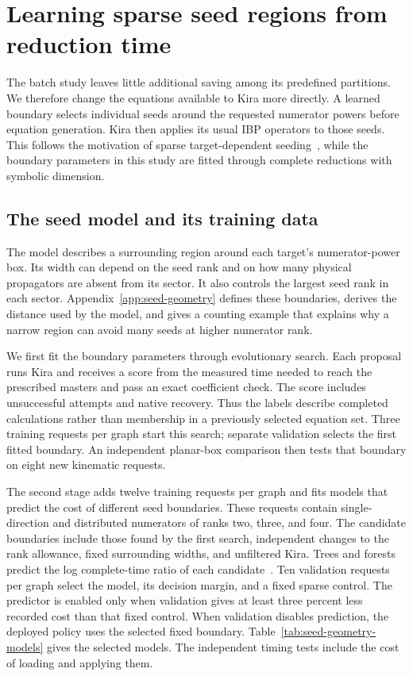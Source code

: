\section{Learning sparse seed regions from reduction time}
\label{sec:seed-geometry}
The batch study leaves little additional saving among its predefined partitions. We therefore change the equations available to Kira more directly. A learned boundary selects individual seeds around the requested numerator powers before equation generation. Kira then applies its usual IBP operators to those seeds. This follows the motivation of sparse target-dependent seeding~\cite{TubeSeeding2026}, while the boundary parameters in this study are fitted through complete reductions with symbolic dimension.

\subsection{The seed model and its training data}
The model describes a surrounding region around each target's numerator-power box. Its width can depend on the seed rank and on how many physical propagators are absent from its sector. It also controls the largest seed rank in each sector. Appendix~\ref{app:seed-geometry} defines these boundaries, derives the distance used by the model, and gives a counting example that explains why a narrow region can avoid many seeds at higher numerator rank.

We first fit the boundary parameters through evolutionary search. Each proposal runs Kira and receives a score from the measured time needed to reach the prescribed masters and pass an exact coefficient check. The score includes unsuccessful attempts and native recovery. Thus the labels describe completed calculations rather than membership in a previously selected equation set. Three training requests per graph start this search; separate validation selects the first fitted boundary. An independent planar-box comparison then tests that boundary on eight new kinematic requests.

The second stage adds twelve training requests per graph and fits models that predict the cost of different seed boundaries. These requests contain single-direction and distributed numerators of ranks two, three, and four. The candidate boundaries include those found by the first search, independent changes to the rank allowance, fixed surrounding widths, and unfiltered Kira. Trees and forests predict the log complete-time ratio of each candidate~\cite{CART1984,Breiman2001Forest,Geurts2006ExtraTrees}. Ten validation requests per graph select the model, its decision margin, and a fixed sparse control. The predictor is enabled only when validation gives at least three percent less recorded cost than that fixed control. When validation disables prediction, the deployed policy uses the selected fixed boundary. Table~\ref{tab:seed-geometry-models} gives the selected models. The independent timing tests include the cost of loading and applying them.

